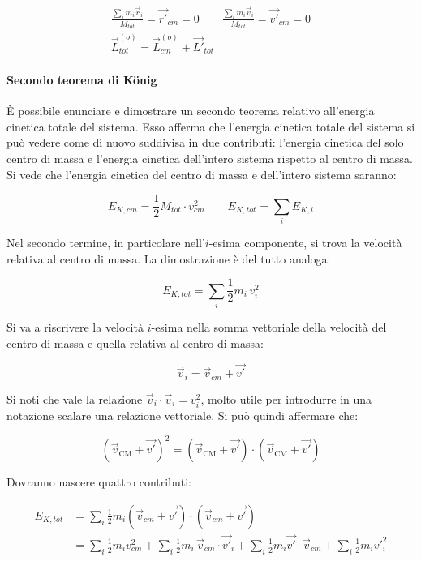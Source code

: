 \begin{gather*}
	\frac{\sum_i m_i\vec{r}_i   }{M_{tot} } = \vec{r'}_{cm} = 0 \qquad \frac{\sum_i m_i\vec{v}_i }{M_{tot} } = \vec{v'}_{cm} = 0 \\
	\boxed{\vec{L}_{tot}^{(o)}   = \vec{L}_{cm}^{(o)} + \vec{L'}_{tot}}
\end{gather*}

\paragraph{Secondo teorema di K\"onig} È possibile enunciare e dimostrare un secondo teorema relativo all'energia cinetica totale del sistema. Esso afferma che l'energia cinetica totale del sistema si può vedere come di nuovo suddivisa in due contributi: l'energia cinetica del solo centro di massa e l'energia cinetica dell'intero sistema rispetto al centro di massa. Si vede che l'energia cinetica del centro di massa e dell'intero sistema saranno:

\[
	E_{K,cm} = \frac{1}{2} M_{tot}\cdot v_{cm}^2 \qquad E_{K,tot} = \sum_i E_{K,i}
\]

Nel secondo termine, in particolare nell'$i$-esima componente, si trova la velocità relativa al centro di massa. La dimostrazione è del tutto analoga:

\[
	E_{K,tot} = \sum_i \frac{1}{2} m_i\,v_i^2
\]

Si va a riscrivere la velocità $i$-esima nella somma vettoriale della velocità del centro di massa e quella relativa al centro di massa:

\[
\vec{v}_i = \vec{v}_{cm} + \vec{v'}
\]

Si noti che vale la relazione $\vec{v}_i \cdot \vec{v}_i = v_i^2$, molto utile per introdurre in una notazione scalare una relazione vettoriale. Si può quindi affermare che:

\[ (\vec{v}_\text{CM}+\vec{v'})^2= (\vec{v}_\text{CM}+\vec{v'}) \cdot (\vec{v}_\text{CM}+\vec{v'}) \]

Dovranno nascere quattro contributi:

\begin{equation*}
	\begin{aligned}
		E_{K,tot} &= \sum_i \frac{1}{2} m_i (\vec{v}_{cm}+\vec{v'}  ) \cdot (\vec{v}_{cm}+\vec{v'}  ) \\
		&= \sum_i \frac{1}{2} m_i v_{cm}^2 + \sum_i \frac{1}{2} m_i\,\vec{v}_{cm}\cdot \vec{v'}_i + \sum_i \frac{1}{2} m_i \vec{v'} \cdot \vec{v}_{cm} + \sum_i \frac{1}{2} m_i v'^2_i
	\end{aligned}
\end{equation*}


